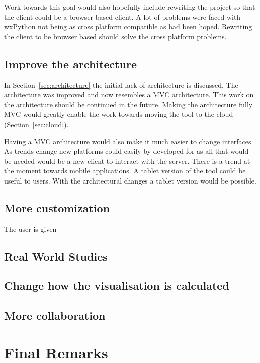 Work towards this goal would also hopefully include rewriting the project so that the client could be a browser based client.  A lot of problems were faced with wxPython not being as cross platform compatible as had been hoped.  Rewriting the client to be browser based should solve the cross platform problems.

\subsection{Improve the architecture}

In Section~\ref{sec:architecture} the initial lack of architecture is discussed.  The architecture was improved and now resembles a \ac{MVC} architecture.  This work on the architecture should be continued in the future.  Making the architecture fully \ac{MVC} would greatly enable the work towards moving the tool to the cloud (Section~\ref{sec:cloud}).

Having a \ac{MVC} architecture would also make it much easier to change interfaces.  As trends change new platforms could easily by developed for as all that would be needed would be a new client to interact with the server.  There is a trend at the moment towards mobile applications.  A tablet version of the tool could be useful to users.  With the architectural changes a tablet version would be possible.

\subsection{More customization}
The user is given

\subsection{Real World Studies}

\subsection{Change how the visualisation is calculated}

\subsection{More collaboration}

\section{Final Remarks}

